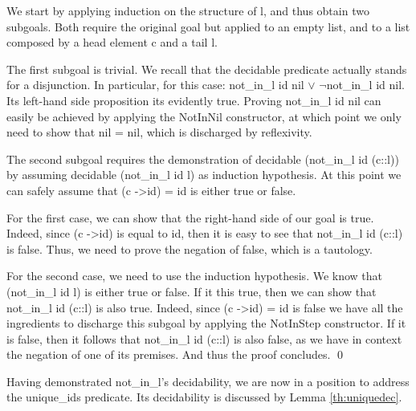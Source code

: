 		\begin{lemma} \label{th:notindec} 
				
		
			We start by applying induction on the structure of \textsf{l}, and thus
		obtain two subgoals. Both require the original goal but applied 		
		to an empty list, and to a list composed by a head element \textsf{c}
		and a tail \textsf{l}.
		
			The first subgoal is trivial. We recall that the \textsf{decidable} predicate 
		actually stands for a disjunction. In particular, for this 
		case: \textsf{not\_in\_l id nil $\lor$ $\neg$not\_in\_l id nil}. Its left-hand side
		proposition its evidently true. Proving \textsf{not\_in\_l id nil} can easily be achieved by applying
		the \textsf{NotInNil} constructor, at which point we only need to show that
		\textsf{nil = nil}, which is discharged by reflexivity. 
		
			The second subgoal requires the demonstration of \textsf{decidable (not\_in\_l id (c::l))} by assuming
		\textsf{decidable (not\_in\_l id l)} as induction hypothesis. At this point we can safely assume that
		\textsf{(c ->id) = id} is either true or false. 
		
		For the first case, we can show that the right-hand side
		of our goal is true. Indeed, since \textsf{(c ->id)} is equal to \textsf{id}, then it is easy to see that
		\textsf{not\_in\_l id (c::l)} is false. Thus, we need to prove the negation of false, which is a		
		tautology. 
		
		For the second case, we need to use the induction hypothesis. We  know that 
		\textsf{(not\_in\_l id l)} is either true or false. If it this true, then we can show that
		\textsf{not\_in\_l id (c::l)} is also true. Indeed, since \textsf{(c ->id) = id} is false
		we have all the ingredients to discharge this subgoal by applying the \textsf{NotInStep} 
		constructor. If it is false, then it follows that \textsf{not\_in\_l id (c::l)} is also false, as we
		have in context the negation of one of its premises. And thus the proof concludes. \qed		
		\end{lemma}
				
		Having demonstrated \textsf{not\_in\_l}'s decidability, we are now in a position to
	address the \textsf{unique\_ids} predicate. Its decidability is discussed
	by Lemma \ref{th:uniquedec}.	
	
